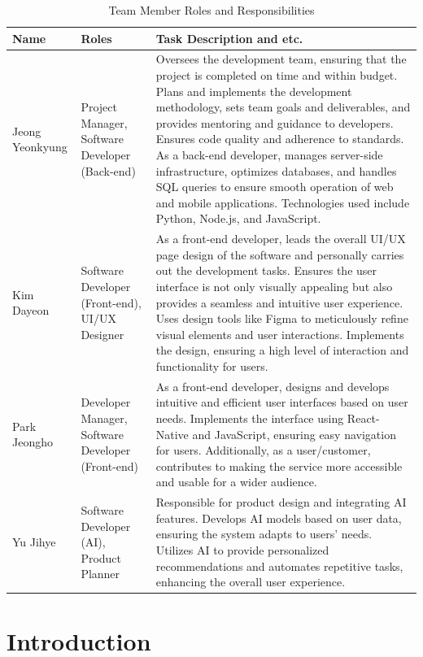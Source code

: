\begin{table}[htbp]
\centering
\caption{Team Member Roles and Responsibilities}
\begin{tabular}{|p{1cm}|p{1.7cm}|p{5cm}|}
    \hline
    \textbf{Name} & \textbf{Roles} & \textbf{Task Description and etc.} \\
    \hline
    Jeong Yeonkyung & Project Manager, Software Developer (Back-end) & Oversees the development team, ensuring that the project is completed on time and within budget. Plans and implements the development methodology, sets team goals and deliverables, and provides mentoring and guidance to developers. Ensures code quality and adherence to standards. As a back-end developer, manages server-side infrastructure, optimizes databases, and handles SQL queries to ensure smooth operation of web and mobile applications. Technologies used include Python, Node.js, and JavaScript. \\
    \hline
    Kim Dayeon & Software Developer (Front-end), UI/UX Designer & As a front-end developer, leads the overall UI/UX page design of the software and personally carries out the development tasks. Ensures the user interface is not only visually appealing but also provides a seamless and intuitive user experience. Uses design tools like Figma to meticulously refine visual elements and user interactions. Implements the design, ensuring a high level of interaction and functionality for users. \\
    \hline
    Park Jeongho & Developer Manager, Software Developer (Front-end) & As a front-end developer, designs and develops intuitive and efficient user interfaces based on user needs. Implements the interface using React-Native and JavaScript, ensuring easy navigation for users. Additionally, as a user/customer, contributes to making the service more accessible and usable for a wider audience. \\
    \hline
    Yu Jihye & Software Developer (AI), Product Planner & Responsible for product design and integrating AI features. Develops AI models based on user data, ensuring the system adapts to users' needs. Utilizes AI to provide personalized recommendations and automates repetitive tasks, enhancing the overall user experience. \\
    \hline
\end{tabular}
\end{table}


\section{Introduction}
